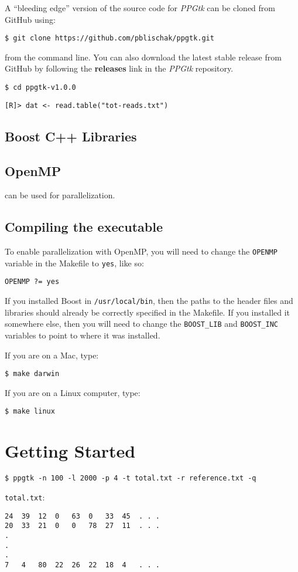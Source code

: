 \documentclass[11pt,english,letterpaper,oneside]{article}
\newcommand{\ppgtk}{\textit{PPGtk}}
\newcommand{\code}[1]{\hspace{15pt} \texttt{#1}}
\begin{document}
A ``bleeding edge'' version of the source code for \ppgtk{} can be cloned from GitHub using:

\code{\$ git clone https://github.com/pblischak/ppgtk.git}

from the command line. You can also download the latest stable release from GitHub by following the \textbf{releases} link in the \ppgtk{} repository.

\code{\$ cd ppgtk-v1.0.0}

\code{[R]> dat <- read.table("tot-reads.txt")}

\subsection{Boost C++ Libraries}


\subsection{OpenMP}

can be used for parallelization.

\subsection{Compiling the executable}

To enable parallelization with OpenMP, you will need to change the \texttt{OPENMP} variable in the Makefile to \texttt{yes}, like so:

\code{OPENMP ?= yes}

If you installed Boost in \texttt{/usr/local/bin}, then the paths to the header files and libraries should already be correctly specified in the Makefile. If you installed it somewhere else, then you will need to change the \texttt{BOOST\_LIB} and \texttt{BOOST\_INC} variables to point to where it was installed.

If you are on a Mac, type:

\code{\$ make darwin}

If you are on a Linux computer, type:

\code{\$ make linux}

\section{Getting Started}

\code{\$ ppgtk -n 100 -l 2000 -p 4 -t total.txt -r reference.txt -q}

\texttt{total.txt}:

\begin{verbatim}
24	39	12	0	63	0	33	45	. . .
20	33	21	0	0	78	27	11	. . .
.
.
.
7	4	80	22	26	22	18	4	. . .
\end{verbatim}

\newpage

%
%
\end{document}
